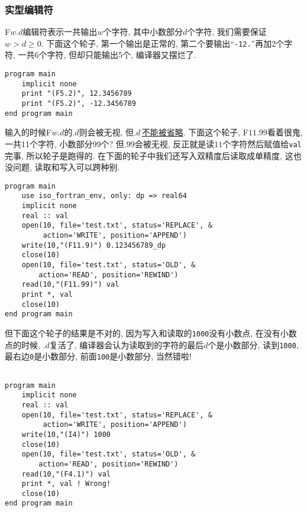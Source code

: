\subsubsection{实型编辑符}

F$w.d$编辑符表示一共输出$w$个字符, 其中小数部分$d$个字符, 我们需要保证$w>d\geqslant0$. 下面这个轮子, 第一个输出是正常的, 第二个要输出``\verb|-12.|''再加2个字符, 一共6个字符, 但却只能输出5个, 编译器又摆烂了.
\begin{verbatim}
program main
    implicit none
    print "(F5.2)", 12.3456789
    print "(F5.2)", -12.3456789
end program main
\end{verbatim}

输入的时候F$w.d$的$.d$则会被无视, 但$.d\,$\uline{不能被省略}. 下面这个轮子, F$11.99$看着很鬼, 一共11个字符, 小数部分99个? 但$.99$会被无视, 反正就是读$11$个字符然后赋值给\verb|val|完事, 所以轮子是跑得的. 在下面的轮子中我们还写入双精度后读取成单精度, 这也没问题, 读取和写入可以跨种别.
\begin{verbatim}
program main
    use iso_fortran_env, only: dp => real64
    implicit none
    real :: val
    open(10, file='test.txt', status='REPLACE', &
         action='WRITE', position='APPEND')
    write(10,"(F11.9)") 0.123456789_dp
    close(10)
    open(10, file='test.txt', status='OLD', &
        action='READ', position='REWIND')
    read(10,"(F11.99)") val
    print *, val
    close(10)
end program main
\end{verbatim}
但下面这个轮子的结果是不对的, 因为写入和读取的\verb|1000|没有小数点, 在没有小数点的时候, $.d$复活了, 编译器会认为读取到的字符的最后$d$个是小数部分, 读到\verb|1000|, 最右边\verb|0|是小数部分, 前面\verb|100|是小数部分, 当然错啦!
\begin{verbatim}

program main
    implicit none
    real :: val
    open(10, file='test.txt', status='REPLACE', &
         action='WRITE', position='APPEND')
    write(10,"(I4)") 1000
    close(10)
    open(10, file='test.txt', status='OLD', &
        action='READ', position='REWIND')
    read(10,"(F4.1)") val
    print *, val ! Wrong!
    close(10)
end program main
\end{verbatim}

